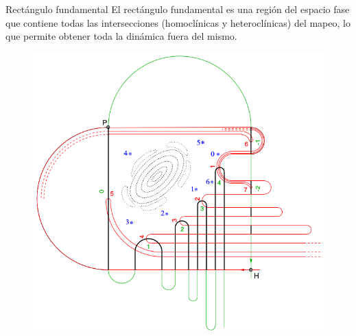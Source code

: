 \documentclass[11pt]{beamer}
\theoremstyle{definition}
\begin{document}
\begin{frame}{Rect\'angulo fundamental}
 El rect\'angulo fundamental es una región del espacio fase que contiene todas las intersecciones (homoclínicas y heteroclínicas) del mapeo, lo que permite obtener toda la dinámica fuera del mismo.
\begin{figure}
	\centering
	\includegraphics[scale=0.20]{herradura}
	\label{herradura}
\end{figure}

\end{frame}
\end{document}
